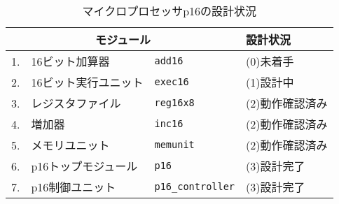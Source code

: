\begin{table}[htb]
\caption{マイクロプロセッサp16の設計状況}
\label{tab:マイクロプロセッサp16の設計状況}
\begin{center}
{\small
\begin{tabular}{rll|l}
\hline
\hline
\multicolumn{3}{c|}{モジュール} & 設計状況 \\
\hline
1. & 16ビット加算器       & \verb|add16|          & (0)未着手 \\
2. & 16ビット実行ユニット & \verb|exec16|         & (1)設計中 \\
3. & レジスタファイル     & \verb|reg16x8|        & (2)動作確認済み \\
4. & 増加器               & \verb|inc16|          & (2)動作確認済み \\
5. & メモリユニット       & \verb|memunit|        & (2)動作確認済み \\
6. & p16トップモジュール  & \verb|p16|            & (3)設計完了 \\
7. & p16制御ユニット      & \verb|p16_controller| & (3)設計完了 \\
\hline
\end{tabular}
}
\end{center}
\end{table}
